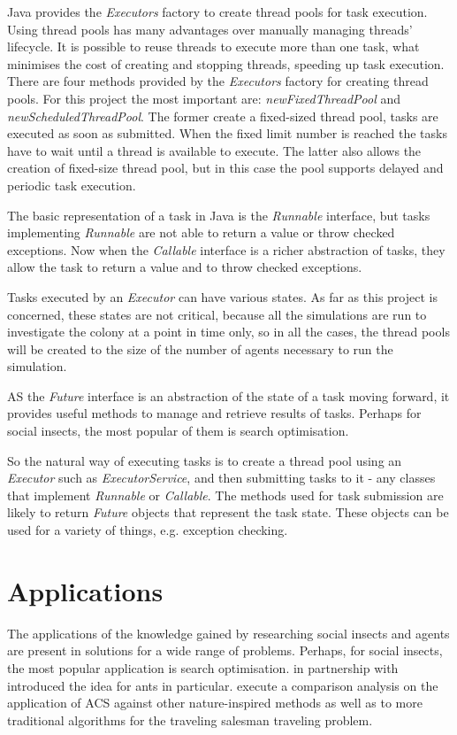 Java provides the \emph{Executors} factory to create thread pools for task execution. Using thread pools has many advantages over manually managing threads' lifecycle. It is possible to reuse threads to execute more than one task, what minimises the cost of creating and stopping threads, speeding up task execution. There are four methods provided by the \emph{Executors} factory for creating thread pools. For this project the most important are: \emph{newFixedThreadPool} and \emph{newScheduledThreadPool}. The former create a fixed-sized thread pool, tasks are executed as soon as submitted. When the fixed limit number is reached the tasks have to wait until a thread is available to execute. The latter also allows the creation of fixed-size thread pool, but in this case the pool supports delayed and periodic task execution.

The basic representation of a task in Java is the \emph{Runnable} interface, but tasks implementing \emph{Runnable} are not able to return a value or throw checked exceptions.\cite{goetz2006java} Now when the \emph{Callable} interface is a richer abstraction of tasks, they allow the task to return a value and to throw checked exceptions. 

Tasks executed by an \emph{Executor} can have various states. As far as this project is concerned, these states are not critical, because all the simulations are run to investigate the colony at a point in time only, so in all the cases, the thread pools will be created to the size of the number of agents necessary to run the simulation.

AS the \emph{Future} interface is an abstraction of the state of a task moving forward, it provides useful methods to manage and retrieve results of tasks. Perhaps for social insects, the most popular of them is search optimisation.

So the natural way of executing tasks is to create a thread pool using an \emph{Executor} such as \emph{ExecutorService}, and then submitting tasks to it - any classes that implement \emph{Runnable} or \emph{Callable}. The methods used for task submission are likely to return \emph{Future} objects that represent the task state. These objects can be used for a variety of things, e.g. exception checking.

\section{Applications}

The applications of the knowledge gained by researching social insects and agents are present in solutions for a wide range of problems. Perhaps, for social insects, the most popular application is search optimisation. \citeauthor{dorigo-phd} \cite{dorigo-phd} in partnership with \citeauthor{citeulike:5791708} \cite{citeulike:5791708, citeulike:7034555, citeulike:832379} introduced the idea for ants in particular. \citeauthor{Dorigo97antcolony} \cite{Dorigo97antcolonies, Dorigo97antcolony} execute a comparison analysis on the application of \ac{ACS} against other nature-inspired methods as well as to more traditional algorithms for the traveling salesman traveling problem. 

